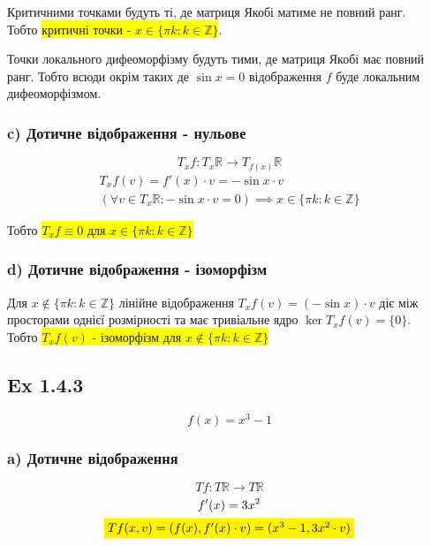 \documentclass[10pt, a4paper]{article} %
\newcommand{\R}{\mathbb{R}}
\newcommand{\todo}[1]{\colorbox{red}{\textbf{TODO}: #1}}
\begin{document}
Критичними точками будуть ті, де матриця Якобі матиме не повний ранг.\\
Тобто \colorbox{yellow}{критичні точки - $x \in \{\pi k : k\in\mathbb Z\}$}.

Точки локального дифеоморфізму будуть тими, де матриця Якобі має повний ранг.
Тобто всюди окрім таких де $\sin x = 0$ відображення $f$ буде локальним дифеоморфізмом.

\subsubsection*{c) Дотичне відображення - нульове}
\[T_{x}f : T_{x}\R \to T_{f(x)}\R\]
\begin{gather*}
    T_{x}f(v) = f'(x) \cdot v = -\sin x \cdot v\\
    \left(\forall v\in T_{x}\R: -\sin x \cdot v = 0\right) \implies  x \in \{\pi k : k\in\mathbb Z\}
\end{gather*}

Тобто \colorbox{yellow}{$T_{x}f \equiv 0$ для $x \in \{\pi k : k\in\mathbb Z\}$}

\subsubsection*{d) Дотичне відображення - ізоморфізм}

Для $x \notin \{\pi k : k\in\mathbb Z\}$ лінійне відображення $T_{x}f(v) = (-\sin x) \cdot v$ діє між просторами однієї розмірності та має тривіальне ядро $\ker T_{x}f(v) = \{0\}$. \\
Тобто \colorbox{yellow}{$T_{x}f(v)$ - ізоморфізм для $x \notin \{\pi k : k\in\mathbb Z\}$}


\subsection*{Ex 1.4.3}
\begin{mdframed}
    \[f(x) = x^3 - 1\]
\end{mdframed}

\subsubsection*{a) Дотичне відображення}
\[Tf : T\R \to T\R\]
\begin{gather*}
    f'(x) = 3x^2\\
    \colorbox{yellow}{$Tf(x,v) = (f(x), f'(x)\cdot v) = (x^3-1, 3x^2 \cdot v)$}
\end{gather*}
\end{document}
